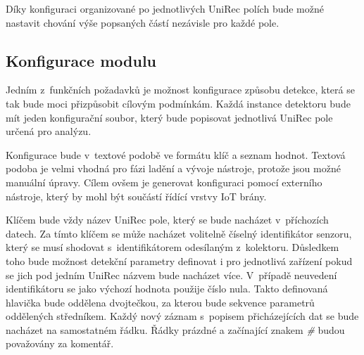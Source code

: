  Díky konfiguraci organizované po jednotlivých UniRec polích bude možné nastavit chování výše
 popsaných částí nezávisle pro každé pole.
 
 \subsection{Konfigurace modulu} \label{config_file}
 Jedním z~funkčních požadavků je možnost konfigurace způsobu detekce, která se tak bude moci přizpůsobit 
 cílovým podmínkám. Každá instance detektoru bude mít jeden konfigurační soubor, který bude 
 popisovat jednotlivá UniRec pole určená pro analýzu.
 
 Konfigurace bude v~textové podobě ve formátu klíč a seznam hodnot. Textová podoba je velmi vhodná pro 
 fázi ladění a vývoje nástroje, protože jsou možné manuální úpravy. Cílem ovšem je generovat 
 konfiguraci pomocí externího nástroje, který by mohl být součástí řídící vrstvy IoT brány. 
 
 Klíčem bude vždy název UniRec pole, který se bude nacházet v~příchozích datech. Za tímto klíčem
 se může nacházet volitelně číselný identifikátor senzoru, který se musí shodovat
s~identifikátorem odesílaným z~kolektoru. Důsledkem toho bude možnost detekční parametry
 definovat i pro jednotlivá zařízení pokud se jich pod jedním UniRec názvem bude nacházet 
 více. V~případě neuvedení identifikátoru se jako výchozí hodnota použije číslo nula.
 Takto definovaná hlavička bude oddělena dvojtečkou, za kterou bude sekvence parametrů
 oddělených středníkem. Každý nový záznam s~popisem přicházejících dat
 se bude nacházet na samostatném řádku. Řádky prázdné a začínající znakem \textit{\#} budou
 považovány za komentář. 
 
